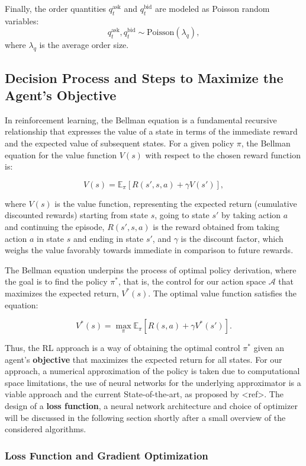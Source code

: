 Finally, the order quantities \( q_t^{\text{ask}} \) and \( q_t^{\text{bid}} \) are modeled as Poisson random variables:
$$
q_t^{\text{ask}}, q_t^{\text{bid}} \sim \text{Poisson}(\lambda_q),
$$
where \( \lambda_q \) is the average order size.

\subsection{Decision Process and Steps to Maximize the Agent's Objective}

In reinforcement learning, the Bellman equation is a fundamental recursive relationship that expresses the value of a state in terms of the immediate reward and the expected value of subsequent states. For a given policy $\pi$, the Bellman equation for the value function $V(s)$ with respect to the chosen reward function is:

$$
V(s) = \mathbb{E}_{\pi} \left[ R(s', s, a) + \gamma V(s') \right],
$$

where $V(s)$ is the value function, representing the expected return (cumulative discounted rewards) starting from state $s$, going to state $s'$ by taking action $a$ and continuing the episode, $R(s', s, a)$ is the reward obtained from taking action $a$ in state $s$ and ending in state $s'$,
and $\gamma$ is the discount factor, which weighs the value favorably towards immediate in comparison to future rewards.

The Bellman equation underpins the process of optimal policy derivation, where the goal is to find the policy $\pi^*$, that is, the control for our action space $\mathcal{A}$ that maximizes the expected return, $V^*(s)$. The optimal value function satisfies the equation:

$$
V^*(s) = \max_{\pi} \mathbb{E}_{\pi} \left[ R(s, a) + \gamma V^*(s') \right].
$$

Thus, the RL approach is a way of obtaining the optimal control $\pi^*$ given an agent's \textbf{objective} that maximizes the expected return for all states. For our approach, a numerical approximation of the policy is taken due to computational space limitations, the use of neural networks for the underlying approximator is a viable approach and the current State-of-the-art, as proposed by <ref>. The design of a \textbf{loss function}, a neural network architecture and choice of optimizer will be discussed in the following section shortly after a small overview of the considered algorithms.

\subsubsection{Loss Function and Gradient Optimization}

